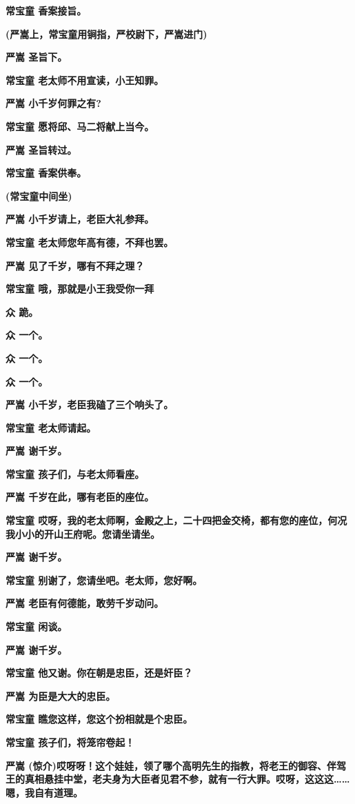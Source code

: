 \textbf{常宝童 香案接旨。}

\textbf{(严嵩上，常宝童用锏指，严校尉下，严嵩进门)}

\textbf{严嵩 圣旨下。}

\textbf{常宝童 老太师不用宣读，小王知罪。}

\textbf{严嵩 小千岁何罪之有?}

\textbf{常宝童 愿将邱、马二将献上当今。}

\textbf{严嵩 圣旨转过。}

\textbf{常宝童 香案供奉。}

\textbf{(常宝童中间坐)}

\textbf{严嵩 小千岁请上，老臣大礼参拜。}

\textbf{常宝童 老太师您年高有德，不拜也罢。}

\textbf{严嵩 见了千岁，哪有不拜之理？}

\textbf{常宝童 哦，那就是小王我受你一拜}

\textbf{众 跪。}

\textbf{众 一个。}

\textbf{众 一个。}

\textbf{众 一个。}

\textbf{严嵩 小千岁，老臣我磕了三个响头了。}

\textbf{常宝童 老太师请起。}

\textbf{严嵩 谢千岁。}

\textbf{常宝童 孩子们，与老太师看座。}

\textbf{严嵩 千岁在此，哪有老臣的座位。}

\textbf{常宝童
哎呀，我的老太师啊，金殿之上，二十四把金交椅，都有您的座位，何况我小小的开山王府呢。您请坐请坐。}

\textbf{严嵩 谢千岁。}

\textbf{常宝童 别谢了，您请坐吧。老太师，您好啊。}

\textbf{严嵩 老臣有何德能，敢劳千岁动问。}

\textbf{常宝童 闲谈。}

\textbf{严嵩 谢千岁。}

\textbf{常宝童 他又谢。你在朝是忠臣，还是奸臣？}

\textbf{严嵩 为臣是大大的忠臣。}

\textbf{常宝童 瞧您这样，您这个扮相就是个忠臣。}

\textbf{常宝童 孩子们，将笼帘卷起！}

\textbf{严嵩
(惊介)哎呀呀！这个娃娃，领了哪个高明先生的指教，将老王的御容、伴驾王的真相悬挂中堂，老夫身为大臣者见君不参，就有一行大罪。哎呀，这这这\ldots{}\ldots{}嗯，我自有道理。}

